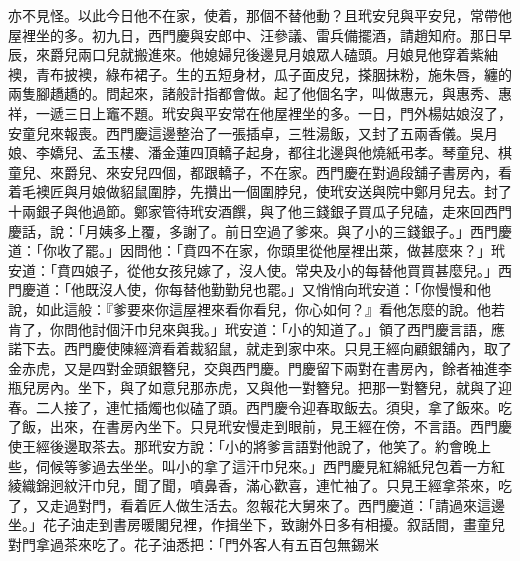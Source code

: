 亦不見怪。以此今日他不在家，使着，那個不替他動？且玳安兒與平安兒，常帶他屋裡坐的多。初九日，西門慶與安郎中、汪參議、雷兵備擺酒，請趙知府。那日早辰，來爵兒兩口兒就搬進來。他媳婦兒後邊見月娘眾人磕頭。月娘見他穿着紫紬襖，青布披襖，綠布裙子。生的五短身材，瓜子面皮兒，搽胭抹粉，施朱唇，纏的兩隻腳趫趫的。問起來，諸般計指都會做。起了他個名字，叫做惠元，與惠秀、惠祥，一遞三日上竈不題。玳安與平安常在他屋裡坐的多。一日，門外楊姑娘沒了，安童兒來報喪。西門慶這邊整治了一張插卓，三牲湯飯，又封了五兩香儀。吳月娘、李嬌兒、孟玉樓、潘金蓮四頂轎子起身，都往北邊與他燒紙弔孝。琴童兒、棋童兒、來爵兒、來安兒四個，都跟轎子，不在家。西門慶在對過段舖子書房內，看着毛襖匠與月娘做貂鼠圍脖，先攢出一個圍脖兒，使玳安送與院中鄭月兒去。封了十兩銀子與他過節。鄭家管待玳安酒饌，與了他三錢銀子買瓜子兒磕，走來回西門慶話，說：「月姨多上覆，多謝了。前日空過了爹來。與了小的三錢銀子。」西門慶道：「你收了罷。」因問他：「賁四不在家，你頭里從他屋裡出萊，做甚麼來？」玳安道：「賁四娘子，從他女孩兒嫁了，沒人使。常央及小的每替他買買甚麼兒。」西門慶道：「他既沒人使，你每替他勤勤兒也罷。」又悄悄向玳安道：「你慢慢和他說，如此這般：『爹要來你這屋裡來看你看兒，你心如何？』看他怎麼的說。他若肯了，你問他討個汗巾兒來與我。」玳安道：「小的知道了。」領了西門慶言語，應諾下去。西門慶使陳經濟看着裁貂鼠，就走到家中來。只見王經向顧銀舖內，取了金赤虎，又是四對金頭銀簪兒，交與西門慶。門慶留下兩對在書房內，餘者袖進李瓶兒房內。坐下，與了如意兒那赤虎，又與他一對簪兒。把那一對簪兒，就與了迎春。二人接了，連忙插燭也似磕了頭。西門慶令迎春取飯去。須臾，拿了飯來。吃了飯，出來，在書房內坐下。只見玳安慢走到眼前，見王經在傍，不言語。西門慶使王經後邊取茶去。那玳安方說：「小的將爹言語對他說了，他笑了。約會晚上些，伺候等爹過去坐坐。叫小的拿了這汗巾兒來。」西門慶見紅綿紙兒包着一方紅綾織錦迥紋汗巾兒，聞了聞，噴鼻香，滿心歡喜，連忙袖了。只見王經拿茶來，吃了，又走過對門，看着匠人做生活去。忽報花大舅來了。西門慶道：「請過來這邊坐。」花子油走到書房暖閣兒裡，作揖坐下，致謝外日多有相擾。叙話間，畫童兒對門拿過茶來吃了。花子油悉把：「門外客人有五百包無錫米 